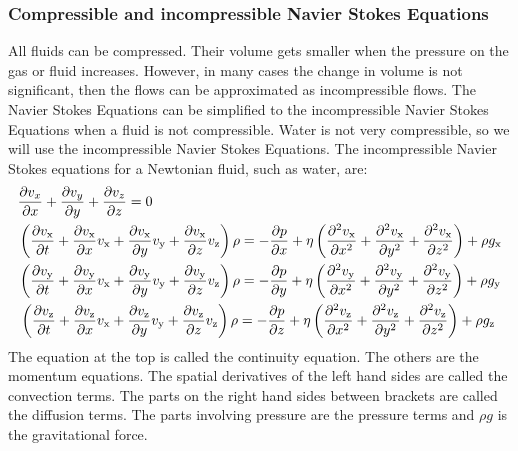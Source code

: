 \documentclass{article}
\begin{document}
\subsubsection{Compressible and incompressible Navier Stokes Equations}
All fluids can be compressed. Their volume gets smaller when the pressure on the gas or fluid increases. However, in many cases the change in volume is not significant, then the flows can be approximated as incompressible flows. The Navier Stokes Equations can be simplified to the incompressible Navier Stokes Equations when a fluid is not compressible. Water is not very compressible\cite{NSE features}, so we will use the incompressible Navier Stokes Equations. The incompressible Navier Stokes equations for a Newtonian fluid, such as water, are:\cite{Navier Stokes incompressible} \cite{NASA NSE}
\begin{equation}
\begin{aligned}
&\pdv{v_{x}}{x}+\pdv{v_{y}}{y}+\pdv{v_{z}}{z}=0\\
&\left(\frac{\partial v_{\mathrm{x}}}{\partial t}+\frac{\partial v_{\mathrm{x}}}{\partial x} v_{\mathrm{x}}+\frac{\partial v_{\mathrm{x}}}{\partial y} v_{\mathrm{y}}+\frac{\partial v_{\mathrm{x}}}{\partial z} v_{\mathrm{z}}\right) \rho=-\frac{\partial p}{\partial x}+\eta\left(\frac{\partial^{2} v_{\mathrm{x}}}{\partial x^{2}}+\frac{\partial^{2} v_{\mathrm{x}}}{\partial y^{2}}+\frac{\partial^{2} v_{\mathrm{x}}}{\partial z^{2}}\right)+\rho g_{\mathrm{x}}\\
&\left(\frac{\partial v_{\mathrm{y}}}{\partial t}+\frac{\partial v_{\mathrm{y}}}{\partial x} v_{\mathrm{x}}+\frac{\partial v_{\mathrm{y}}}{\partial y} v_{\mathrm{y}}+\frac{\partial v_{\mathrm{y}}}{\partial z} v_{\mathrm{z}}\right) \rho=-\frac{\partial p}{\partial y}+\eta\left(\frac{\partial^{2} v_{\mathrm{y}}}{\partial x^{2}}+\frac{\partial^{2} v_{\mathrm{y}}}{\partial y^{2}}+\frac{\partial^{2} v_{\mathrm{y}}}{\partial z^{2}}\right)+\rho g_{\mathrm{y}}\\
&\left . \left(\frac{\partial v_{\mathrm{z}}}{\partial t}+\frac{\partial v_{\mathrm{z}}}{\partial x} v_{\mathrm{x}}+\frac{\partial v_{\mathrm{z}}}{\partial y} v_{\mathrm{y}}+\frac{\partial v_{\mathrm{z}}}{\partial z} v_{\mathrm{z}}\right) \rho=-\frac{\partial p}{\partial z}+\eta\left(\frac{\partial^{2} v_{\mathrm{z}}}{\partial x^{2}}+\frac{\partial^{2} v_{\mathrm{z}}}{\partial y^{2}}+\frac{\partial^{2} v_{\mathrm{z}}}{\partial z^{2}}\right)+\rho g_{\mathrm{z}}\right .
\end{aligned}
\label{NSE incompressible}
\end{equation}
The equation at the top is called the continuity equation. The others are the momentum equations. The spatial derivatives of the left hand sides are called the convection terms. The parts on the right hand sides between brackets are called the diffusion terms. The parts involving pressure are the pressure terms and \(\rho g\) is the gravitational force.
\end{document}
